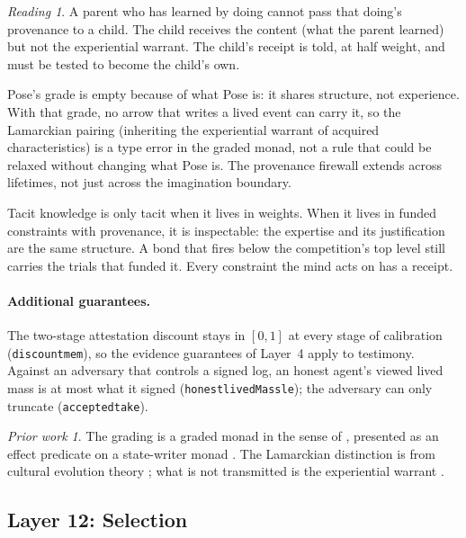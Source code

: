 \documentclass[11pt]{article}
\newcommand{\leanus}{\textunderscore\allowbreak}
\newcommand{\lean}[1]{{\let\_\leanus\texttt{#1}}}
\theoremstyle{remark}
\newtheorem*{reading}{Reading}
\newtheorem*{prior}{Prior work}
\begin{document}
\begin{reading}
A parent who has learned by doing cannot pass that doing's provenance to a child. The child
receives the content (what the parent learned) but not the experiential warrant. The
child's receipt is told, at half weight, and must be tested to become the child's own.

Pose's grade is empty because of what Pose is: it shares structure, not experience. With
that grade, no arrow that writes a lived event can carry it, so the Lamarckian pairing
(inheriting the experiential warrant of acquired characteristics) is a type error in the
graded monad, not a rule that could be relaxed without changing what Pose is. The provenance firewall extends across lifetimes, not just across the
imagination boundary.

Tacit knowledge is only tacit when it lives in weights. When it lives in funded constraints
with provenance, it is inspectable: the expertise and its justification are the same
structure. A bond that fires below the competition's top level still carries the trials
that funded it. Every constraint the mind acts on has a receipt.
\end{reading}

\paragraph{Additional guarantees.} The two-stage attestation discount stays in $[0,1]$ at
every stage of calibration (\lean{discount\_mem}), so the evidence guarantees of Layer~4
apply to testimony. Against an adversary that controls a signed log, an honest agent's
viewed lived mass is at most what it signed (\lean{honest\_livedMass\_le}); the adversary
can only truncate (\lean{accepted\_take}).

\begin{prior}
The grading is a graded monad in the sense of \citet{Katsumata2014}, presented as an
effect predicate on a state-writer monad
\citep{LucassenGifford1988,FujiiKatsumataMellies2016,OrchardPetricek2014}. The Lamarckian
distinction is from cultural evolution theory \citep{BoydRicherson1985}; what is not
transmitted is the experiential warrant \citep{Kronfeldner2007}.
\end{prior}

\subsection{Layer 12: Selection}
\end{document}
